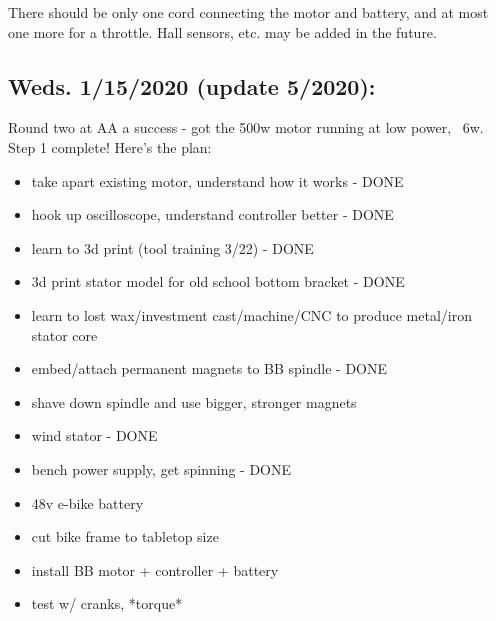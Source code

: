 \documentclass[11pt]{article} %
\begin{document}
\noindent There should be only one cord connecting the motor and battery, and at most one more for a throttle. Hall sensors, etc. may be added in the future.\\




\subsection*{Weds. 1/15/2020 (update 5/2020):} Round two at AA a success - got the 500w motor running at low power, ~6w. Step 1 complete! Here’s the plan: \\

\begin{itemize}
\item take apart existing motor, understand how it works - DONE
\item hook up oscilloscope, understand controller better - DONE
\end{itemize}

\begin{itemize}
\item learn to 3d print (tool training 3/22) - DONE
\item 3d print stator model for old school bottom bracket - DONE
\end{itemize}

\begin{itemize}
\item learn to lost wax/investment cast/machine/CNC to produce metal/iron stator core
\item embed/attach permanent magnets to BB spindle - DONE
\item shave down spindle and use bigger, stronger magnets
\item wind stator - DONE
\end{itemize}

\vspace{5mm}

\begin{itemize}
\item bench power supply, get spinning - DONE
\item 48v e-bike battery
\item cut bike frame to tabletop size
\item install BB motor + controller + battery
\end{itemize}

\vspace{5mm}

\begin{itemize}
\item test w/ cranks, *torque*
\end{itemize}
\end{document}

